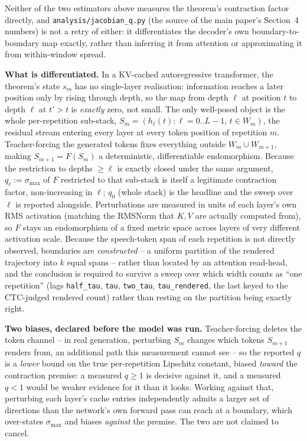\documentclass[11pt]{article}
\begin{document}
Neither of the two estimators above measures the theorem's contraction factor
directly, and \texttt{analysis/jacobian\_q.py} (the source of the main paper's
Section~4 numbers) is not a retry of either: it differentiates the decoder's
own boundary-to-boundary map exactly, rather than inferring it from attention
or approximating it from within-window spread.

\noindent\textbf{What is differentiated.} In a KV-cached autoregressive
transformer, the theorem's state $s_m$ has no single-layer realisation:
information reaches a later position only by rising through depth, so the map
from depth $\ell$ at position $t$ to depth $\ell$ at $t'>t$ is \emph{exactly}
zero, not small. The only well-posed object is the whole per-repetition
sub-stack, $S_m = (h_\ell(t): \ell=0..L-1,\, t\in W_m)$, the residual stream
entering every layer at every token position of repetition $m$. Teacher-forcing
the generated tokens fixes everything outside $W_m\cup W_{m+1}$, making
$S_{m+1}=F(S_m)$ a deterministic, differentiable endomorphism. Because the
restriction to depths $\ge\ell$ is exactly closed under the same argument,
$q_\ell:=\sigma_{\max}$ of $F$ restricted to that sub-stack is itself a
legitimate contraction factor, non-increasing in $\ell$; $q_0$ (whole stack) is
the headline and the sweep over $\ell$ is reported alongside. Perturbations are
measured in units of each layer's own RMS activation (matching the RMSNorm
that $K,V$ are actually computed from), so $F$ stays an endomorphism of a fixed
metric space across layers of very different activation scale. Because the
speech-token span of each repetition is not directly observed, boundaries are
\emph{constructed} -- a uniform partition of the rendered trajectory into $k$
equal spans -- rather than located by an attention read-head, and the
conclusion is required to survive a sweep over which width counts as ``one
repetition'' (lags \texttt{half\_tau}, \texttt{tau}, \texttt{two\_tau},
\texttt{tau\_rendered}, the last keyed to the CTC-judged rendered count) rather
than resting on the partition being exactly right.

\noindent\textbf{Two biases, declared before the model was run.}
Teacher-forcing deletes the token channel -- in real generation, perturbing
$S_m$ changes which tokens $S_{m+1}$ renders from, an additional path this
measurement cannot see -- so the reported $q$ is a \emph{lower} bound on the
true per-repetition Lipschitz constant, biased \emph{toward} the contraction
premise: a measured $q\ge1$ is decisive against it, and a measured $q<1$ would
be weaker evidence for it than it looks. Working against that, perturbing each
layer's cache entries independently admits a larger set of directions than the
network's own forward pass can reach at a boundary, which over-states
$\sigma_{\max}$ and biases \emph{against} the premise. The two are not claimed
to cancel.
\end{document}
